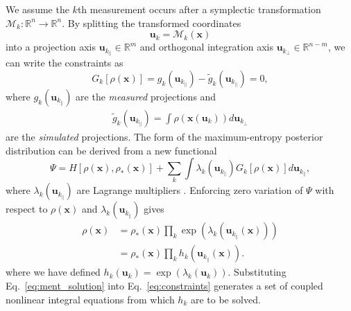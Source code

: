 \documentclass[%
    reprint,
    twocolumn,
    nofootinbib,
    amsmath,
    amssymb,
    aps,
    prstab,
]{revtex4-2}
\newcommand{\vect}[1]{\boldsymbol{\mathbf{#1}}}
\begin{document}
We assume the $k$th measurement occurs after a symplectic transformation $\mathcal{M}_k: \mathbb{R}^n \rightarrow \mathbb{R}^n$. By splitting the transformed coordinates 
%
\begin{equation} \label{eq:forward}
    \vect{u}_k = \mathcal{M}_k(\vect{x})
\end{equation}
%
into a projection axis $\vect{u}_{k_\parallel} \in \mathbb{R}^m$ and orthogonal integration axis $\vect{u}_{k_\perp} \in \mathbb{R}^{n - m}$, we can write the constraints as
%
\begin{equation} \label{eq:constraints}
    G_k \left[ \rho(\vect{x}) \right] 
    = g_k(\vect{u}_{k_\parallel}) - \tilde{g}_k(\vect{u}_{k_\parallel})
    = 0,
\end{equation}
%
where $g_k(\vect{u}_{k_\parallel})$ are the \textit{measured} projections and
%
\begin{equation} \label{eq:simulated-projections}
\begin{aligned}
    \tilde{g}_k(\vect{u}_{k_\parallel}) 
    =
    \int \rho ( \vect{x}(\vect{u}_k) ) d\vect{u}_{k_\perp}
\end{aligned}
\end{equation}
%
are the \textit{simulated} projections. The form of the maximum-entropy posterior distribution can be derived from a new functional
%
\begin{equation}
    \Psi
    =
    H[\rho(\vect{x}), \rho_*(\vect{x})]
    + 
    \sum_{k}^{} {
        \int
        \lambda_{k}(\vect{u}_{k_\parallel})
        G_k \left[ \rho(\vect{x}) \right]
        d\vect{u}_{k_\parallel}
    },
\end{equation}
%
where $\lambda_k(\vect{u}_{k_\parallel})$ are Lagrange multipliers \cite{Mottershead_1996}. Enforcing zero variation of $\Psi$ with respect to $\rho(\vect{x})$ and $ \lambda_k(\vect{u}_{k_\parallel})$ gives
%
\begin{equation} \label{eq:ment_solution}
\begin{aligned}
    \rho(\vect{x}) 
    &= 
    \rho_*(\vect{x}) 
    \prod_{k} \exp{ \left( \lambda_k(\vect{u}_{k_\parallel} (\vect{x})) \right) } 
    \\
    &= 
    \rho_*(\vect{x}) 
    \prod_{k} h_k ( \vect{u}_{k_\parallel} (\vect{x}) ).
\end{aligned}
\end{equation}
%
where we have defined $h_k(\vect{u}_k) = \exp(\lambda_k(\vect{u}_k))$. Substituting Eq.~\eqref{eq:ment_solution} into Eq.~\eqref{eq:constraints} generates a set of coupled nonlinear integral equations from which $h_k$ are to be solved.
\end{document}
